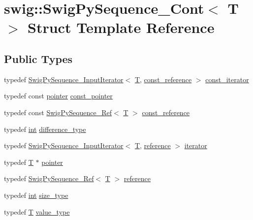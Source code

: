 \hypertarget{structswig_1_1_swig_py_sequence___cont}{}\section{swig\+:\+:Swig\+Py\+Sequence\+\_\+\+Cont$<$ T $>$ Struct Template Reference}
\label{structswig_1_1_swig_py_sequence___cont}
\subsection*{Public Types}
\begin{DoxyCompactItemize}
\item 
typedef \hyperlink{structswig_1_1_swig_py_sequence___input_iterator}{Swig\+Py\+Sequence\+\_\+\+Input\+Iterator}$<$ \hyperlink{fmt_8h_a0acb682b8260ab1c60b918599864e2e5}{T}, \hyperlink{structswig_1_1_swig_py_sequence___cont_a9c8d1d3acc0234f3a9cbd570ee7e9cf0}{const\+\_\+reference} $>$ \hyperlink{structswig_1_1_swig_py_sequence___cont_a708a6b3790b68aa53bd79d27a2c16b89}{const\+\_\+iterator}
\item 
typedef const \hyperlink{structswig_1_1_swig_py_sequence___cont_a168a126e49131e25b2616d411f71fb9a}{pointer} \hyperlink{structswig_1_1_swig_py_sequence___cont_ab4ac20f379a9c7793597569834eb3cf9}{const\+\_\+pointer}
\item 
typedef const \hyperlink{structswig_1_1_swig_py_sequence___ref}{Swig\+Py\+Sequence\+\_\+\+Ref}$<$ \hyperlink{fmt_8h_a0acb682b8260ab1c60b918599864e2e5}{T} $>$ \hyperlink{structswig_1_1_swig_py_sequence___cont_a9c8d1d3acc0234f3a9cbd570ee7e9cf0}{const\+\_\+reference}
\item 
typedef \hyperlink{lp__lib_8h_adeb9ec6400320e4923ac9d836d509ddb}{int} \hyperlink{structswig_1_1_swig_py_sequence___cont_a016875541fce2f04f396da8057a190f9}{difference\+\_\+type}
\item 
typedef \hyperlink{structswig_1_1_swig_py_sequence___input_iterator}{Swig\+Py\+Sequence\+\_\+\+Input\+Iterator}$<$ \hyperlink{fmt_8h_a0acb682b8260ab1c60b918599864e2e5}{T}, \hyperlink{structswig_1_1_swig_py_sequence___cont_a4108668900abc99b72844a3a880b3638}{reference} $>$ \hyperlink{structswig_1_1_swig_py_sequence___cont_abcd331d0657a109f34c0fd84c5be87dd}{iterator}
\item 
typedef \hyperlink{fmt_8h_a0acb682b8260ab1c60b918599864e2e5}{T} $\ast$ \hyperlink{structswig_1_1_swig_py_sequence___cont_a168a126e49131e25b2616d411f71fb9a}{pointer}
\item 
typedef \hyperlink{structswig_1_1_swig_py_sequence___ref}{Swig\+Py\+Sequence\+\_\+\+Ref}$<$ \hyperlink{fmt_8h_a0acb682b8260ab1c60b918599864e2e5}{T} $>$ \hyperlink{structswig_1_1_swig_py_sequence___cont_a4108668900abc99b72844a3a880b3638}{reference}
\item 
typedef \hyperlink{lp__lib_8h_adeb9ec6400320e4923ac9d836d509ddb}{int} \hyperlink{structswig_1_1_swig_py_sequence___cont_a53e4b21ab9cdd6d0e562ef8a0923cabb}{size\+\_\+type}
\item 
typedef \hyperlink{fmt_8h_a0acb682b8260ab1c60b918599864e2e5}{T} \hyperlink{structswig_1_1_swig_py_sequence___cont_adfa84ea05a454d0a9528420256ca89d9}{value\+\_\+type}
\end{DoxyCompactItemize}
